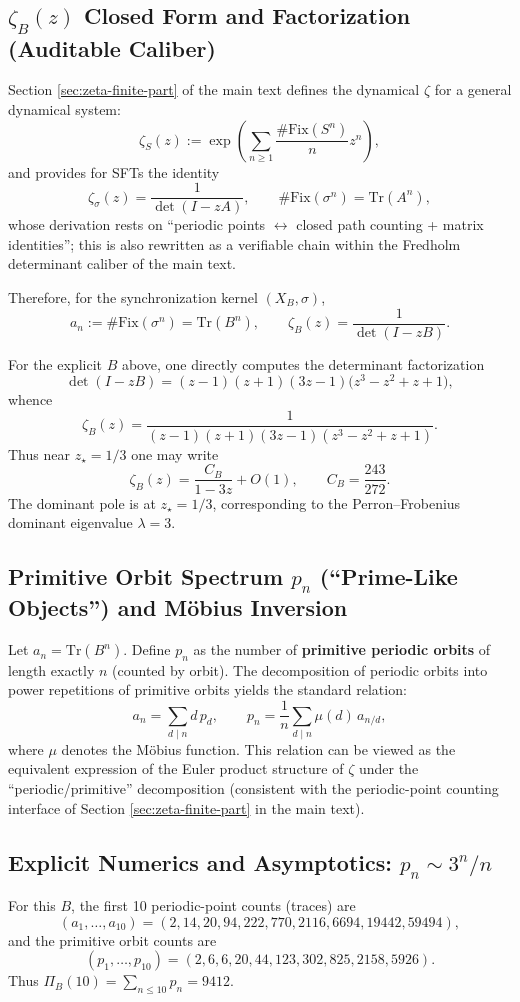 \subsection{\texorpdfstring{$\zeta_B(z)$}{zeta\_B(z)} Closed Form and Factorization (Auditable Caliber)}
Section \ref{sec:zeta-finite-part} of the main text defines the dynamical $\zeta$ for a general dynamical system:
\[
\zeta_S(z):=\exp\!\left(\sum_{n\ge 1}\frac{\#\mathrm{Fix}(S^n)}{n}z^n\right),
\]
and provides for SFTs the identity
\[
\zeta_\sigma(z)=\frac{1}{\det(I-zA)},\qquad
\#\mathrm{Fix}(\sigma^n)=\mathrm{Tr}(A^n),
\]
whose derivation rests on ``periodic points $\leftrightarrow$ closed path counting + matrix identities''; this is also rewritten as a verifiable chain within the Fredholm determinant caliber of the main text.

Therefore, for the synchronization kernel $(X_B,\sigma)$,
\[
a_n:=\#\mathrm{Fix}(\sigma^n)=\mathrm{Tr}(B^n),\qquad
\zeta_B(z)=\frac{1}{\det(I-zB)}.
\]

For the explicit $B$ above, one directly computes the determinant factorization
\[
\det(I-zB)=(z-1)(z+1)(3z-1)\bigl(z^3-z^2+z+1\bigr),
\]
whence
\[
\zeta_B(z)=\frac{1}{(z-1)(z+1)(3z-1)(z^3-z^2+z+1)}.
\]
Thus near $z_\star=1/3$ one may write
\[
\zeta_B(z)=\frac{C_B}{1-3z}+O(1),
\qquad
C_B=\frac{243}{272}.
\]
The dominant pole is at $z_\star=1/3$, corresponding to the Perron--Frobenius dominant eigenvalue $\lambda=3$.

\subsection{Primitive Orbit Spectrum \texorpdfstring{$p_n$}{p\_n} (``Prime-Like Objects'') and M\"obius Inversion}
Let $a_n=\mathrm{Tr}(B^n)$. Define $p_n$ as the number of \textbf{primitive periodic orbits} of length exactly $n$ (counted by orbit). The decomposition of periodic orbits into power repetitions of primitive orbits yields the standard relation:
\[
a_n=\sum_{d\mid n} d\,p_d,
\qquad
p_n=\frac{1}{n}\sum_{d\mid n}\mu(d)\,a_{n/d},
\]
where $\mu$ denotes the M\"obius function. This relation can be viewed as the equivalent expression of the Euler product structure of $\zeta$ under the ``periodic/primitive'' decomposition (consistent with the periodic-point counting interface of Section \ref{sec:zeta-finite-part} in the main text).

\subsection{Explicit Numerics and Asymptotics: \texorpdfstring{$p_n\sim 3^n/n$}{p\_n ~ 3**n/n}}
For this $B$, the first 10 periodic-point counts (traces) are
\[
(a_1,\dots,a_{10})=(2,14,20,94,222,770,2116,6694,19442,59494),
\]
and the primitive orbit counts are
\[
(p_1,\dots,p_{10})=(2,6,6,20,44,123,302,825,2158,5926).
\]
Thus $\Pi_B(10)=\sum_{n\le 10}p_n=9412$.

